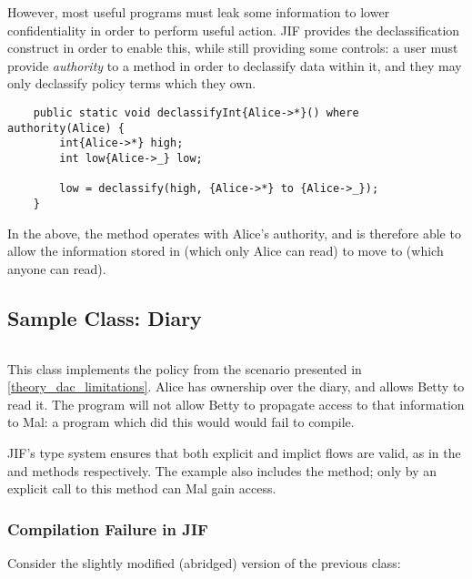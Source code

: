 However, most useful programs must leak some information to lower confidentiality in order to perform useful action. JIF provides the declassification construct in order to enable this, while still providing some controls: a user must provide \textit{authority} to a method in order to declassify data within it, and they may only declassify policy terms which they own.

\begin{verbatim}
	public static void declassifyInt{Alice->*}() where authority(Alice) {
		int{Alice->*} high;
		int low{Alice->_} low;
		
		low = declassify(high, {Alice->*} to {Alice->_});
	}
\end{verbatim}

In the above, the method operates with Alice's authority, and is therefore able to allow the information stored in  (which only Alice can read) to move to  (which anyone can read).

\newpage

\subsection{Sample Class: Diary} \label{jif_bg_sample_diary}

\inputminted{java}{content/code_sections/jif_para_bg/Diary.jif}

This class implements the policy from the scenario presented in \ref{theory_dac_limitations}. Alice has ownership over the diary, and allows Betty to read it. The program will not allow Betty to propagate access to that information to Mal: a program which did this would would fail to compile.

JIF's type system ensures that both explicit and implict flows are valid, as in the  and  methods respectively. The example also includes the  method; only by an explicit call to this method can Mal gain access.

\newpage

\subsubsection{Compilation Failure in JIF}

Consider the slightly modified (abridged) version of the previous class:

\inputminted{java}{content/code_sections/jif_para_bg/DiaryError.jif}

